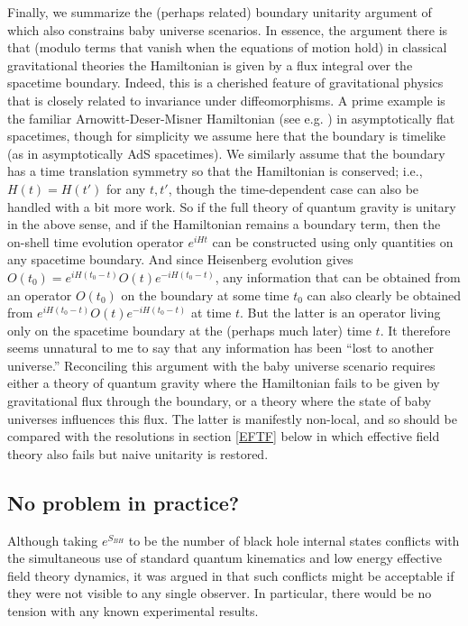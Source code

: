 \documentclass[12pt]{article}
\begin{document}
Finally, we summarize the (perhaps related) boundary unitarity argument of \cite{Marolf:2008mf} which also constrains baby universe scenarios.  In essence, the argument there is that (modulo terms that vanish when the equations of motion hold) in classical gravitational theories the Hamiltonian is given by a flux integral over the spacetime boundary.  Indeed, this is a cherished feature of gravitational physics that is closely related to invariance under diffeomorphisms.   A prime example is the familiar Arnowitt-Deser-Misner Hamiltonian (see e.g. \cite{Wald:1984rg}) in asymptotically flat spacetimes, though for simplicity we assume here that the boundary is timelike (as in asymptotically AdS spacetimes).   We similarly assume that the boundary has a time translation symmetry so that the Hamiltonian is conserved; i.e., $H(t) = H(t')$ for any $t,t'$, though the time-dependent case can also be handled with a bit more work.  So if the full theory of quantum gravity is unitary in the above sense, and if the Hamiltonian remains a boundary term, then the on-shell time evolution operator $e^{iHt}$ can be constructed using only quantities on any spacetime boundary.  And since Heisenberg evolution gives
$O(t_0) =  e^{iH(t_0-t)}O(t) e^{-iH(t_0-t)}$, any information that can be obtained from an operator $O(t_0)$ on the boundary at some time $t_0$ can also clearly be obtained from $e^{iH(t_0-t)}O(t) e^{-iH(t_0-t)}$ at time $t$.  But the latter is an operator living only on the spacetime boundary at the (perhaps much later) time $t$.  It therefore seems unnatural to me to say that any information has been ``lost to another universe.''   Reconciling this argument with the baby universe scenario requires either a theory of quantum gravity where the Hamiltonian fails to be given by gravitational flux through the boundary, or a theory where the state of baby universes influences this flux.  The latter is manifestly non-local, and so should be compared with the resolutions in section \ref{EFTF} below in which effective field theory also fails but naive unitarity is restored.

\subsection{No problem in practice?}  Although taking $e^{S_{BH}}$ to be the number of black hole internal states conflicts with the simultaneous use of standard quantum kinematics and low energy effective field theory dynamics, it was argued in \cite{Susskind:1993if} that such conflicts might be acceptable if they were not visible to any single observer.  In particular, there would be no tension with any known experimental results.
\end{document}
